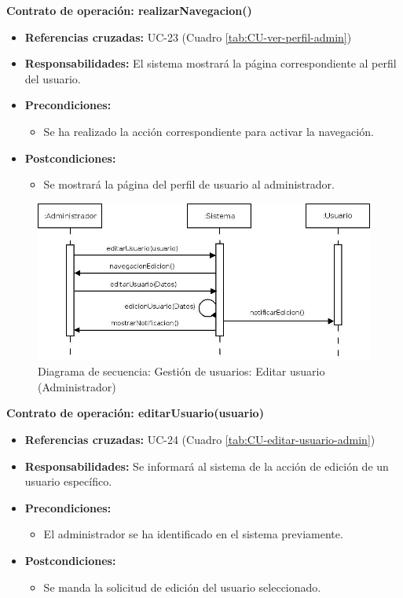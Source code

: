 \textbf{Contrato de operación: realizarNavegacion()}
\begin{itemize}
\item \textbf{Referencias cruzadas:} UC-23 (Cuadro \ref{tab:CU-ver-perfil-admin})
\item \textbf{Responsabilidades:} El sistema mostrará la página correspondiente al perfil del usuario.
\item \textbf{Precondiciones:} 
 \begin{itemize}
\item Se ha realizado la acción correspondiente para activar la navegación.
\end {itemize}
\item \textbf{Postcondiciones:} 
 \begin{itemize}
\item Se mostrará la página del perfil de usuario al administrador.
\end {itemize}
\end {itemize}


\vspace{7mm}
\dotfill
\vspace{7mm}

\begin{figure}[h!]
\centering
  \includegraphics[scale=.50]{img/secuencias/gestion-usuarios-editar-usuario-administrador.jpeg}
  \caption{Diagrama de secuencia: Gestión de usuarios: Editar usuario (Administrador)}
  \label{fig:secuencia-gestion-usuarios-editar-usuario-administrador}
\end{figure}

\textbf{Contrato de operación: editarUsuario(usuario)}
\begin{itemize}
\item \textbf{Referencias cruzadas:} UC-24 (Cuadro \ref{tab:CU-editar-usuario-admin})
\item \textbf{Responsabilidades:} Se informará al sistema de la acción de edición de un usuario específico.
\item \textbf{Precondiciones:} 
 \begin{itemize}
\item El administrador se ha identificado en el sistema previamente.
\end {itemize}
\item \textbf{Postcondiciones:} 
 \begin{itemize}
\item Se manda la solicitud de edición del usuario seleccionado.
\end {itemize}
\end {itemize}

